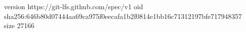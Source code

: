 version https://git-lfs.github.com/spec/v1
oid sha256:646b80d07444aa69ca975f0eecafa1b2f0814e1bb16c71312197bfe717948357
size 27166
